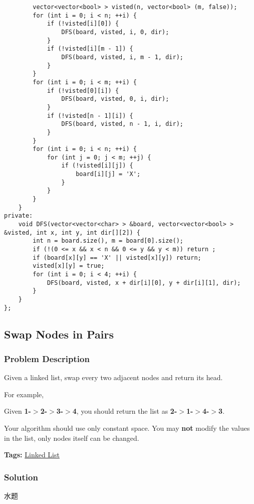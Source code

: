 \documentclass{article}
\begin{document}
\begin{CJK*}{UTF8}{gkai}
\begin{lstlisting}
        vector<vector<bool> > visted(n, vector<bool> (m, false));
        for (int i = 0; i < n; ++i) {
            if (!visted[i][0]) {
                DFS(board, visted, i, 0, dir);
            }
            if (!visted[i][m - 1]) {
                DFS(board, visted, i, m - 1, dir);
            }
        }
        for (int i = 0; i < m; ++i) {
            if (!visted[0][i]) {
                DFS(board, visted, 0, i, dir);
            }
            if (!visted[n - 1][i]) {
                DFS(board, visted, n - 1, i, dir);
            }
        }
        for (int i = 0; i < n; ++i) {
            for (int j = 0; j < m; ++j) {
                if (!visted[i][j]) {
                    board[i][j] = 'X';
                }
            }
        }
    }
private:
    void DFS(vector<vector<char> > &board, vector<vector<bool> > &visted, int x, int y, int dir[][2]) {
        int n = board.size(), m = board[0].size();
        if (!(0 <= x && x < n && 0 <= y && y < m)) return ;
        if (board[x][y] == 'X' || visted[x][y]) return;
        visted[x][y] = true;
        for (int i = 0; i < 4; ++i) {
            DFS(board, visted, x + dir[i][0], y + dir[i][1], dir);
        }
    }
}; 
\end{lstlisting}


\subsection{ Swap Nodes in Pairs }
\label{ Swap Nodes in Pairs }

\subsubsection*{Problem Description}
Given a linked list, swap every two adjacent nodes and return its head.

For example,


Given \textbf{1-$>$2-$>$3-$>$4}, you should return the list as \textbf{2-$>$1-$>$4-$>$3}.

Your algorithm should use only constant space. You may \textbf{not} modify the values in the list, only nodes itself can be changed.


\textbf{Tags: }
\hyperref[ Linked List ]{ Linked List }



\subsubsection*{Solution}
水题


\end{CJK*}
\end{document}
